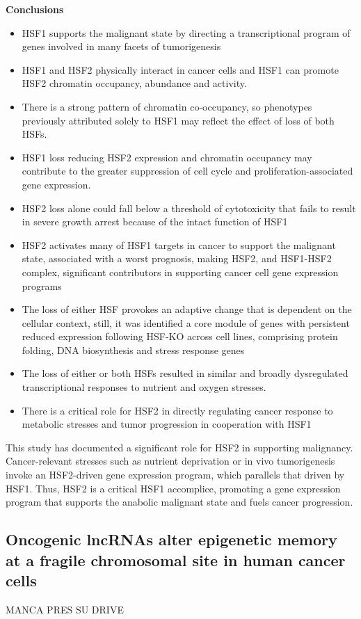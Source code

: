 \textbf{Conclusions}
\begin{itemize}
\tightlist
\item HSF1 supports the malignant state by directing a transcriptional program of genes involved in many facets of tumorigenesis
\item HSF1 and HSF2 physically interact in cancer cells and HSF1 can promote HSF2 chromatin occupancy, abundance
and activity.
\item There is a strong pattern of chromatin co-occupancy, so phenotypes previously attributed solely to HSF1 may
reflect the effect of loss of both HSFs.
\item HSF1 loss reducing HSF2 expression and chromatin occupancy may contribute to the greater suppression of cell
cycle and proliferation-associated gene expression.
\item HSF2 loss alone could fall below a threshold of cytotoxicity that fails to result in severe growth arrest because of the
intact function of HSF1
\item HSF2 activates many of HSF1 targets in cancer to support the malignant state, associated with a worst prognosis, making HSF2, and HSF1-HSF2 complex, significant contributors in supporting cancer cell gene expression programs
\item The loss of either HSF provokes an adaptive change that is dependent on the cellular context, still, it was identified a core module of genes
with persistent reduced expression following HSF-KO across cell lines, comprising protein folding, DNA biosynthesis and stress response genes
\item The loss of either or both HSFs resulted in similar and broadly dysregulated transcriptional
responses to nutrient and oxygen stresses.
\item There is a critical role for HSF2 in directly regulating cancer response to metabolic stresses and tumor progression in cooperation with HSF1
\end{itemize}

This study has documented a significant role for HSF2 in supporting malignancy. Cancer-relevant stresses such as nutrient
deprivation or in vivo tumorigenesis invoke an HSF2-driven gene expression program, which parallels that driven by HSF1.
Thus, HSF2 is a critical HSF1 accomplice, promoting a gene expression program that supports the anabolic malignant state
and fuels cancer progression.

\subsection{Oncogenic lncRNAs alter epigenetic memory at a fragile chromosomal site in human cancer cells}
MANCA PRES SU DRIVE

